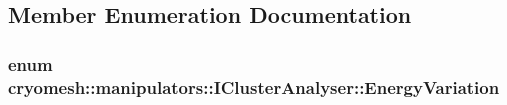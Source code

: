 \subsection{\-Member \-Enumeration \-Documentation}
\hypertarget{classcryomesh_1_1manipulators_1_1IClusterAnalyser_a28a17f8e1363cfb575bacdf213b0781b}{
\subsubsection[{\-Energy\-Variation}]{\setlength{\rightskip}{0pt plus 5cm}enum {\bf cryomesh\-::manipulators\-::\-I\-Cluster\-Analyser\-::\-Energy\-Variation}}}\label{classcryomesh_1_1manipulators_1_1IClusterAnalyser_a28a17f8e1363cfb575bacdf213b0781b}
